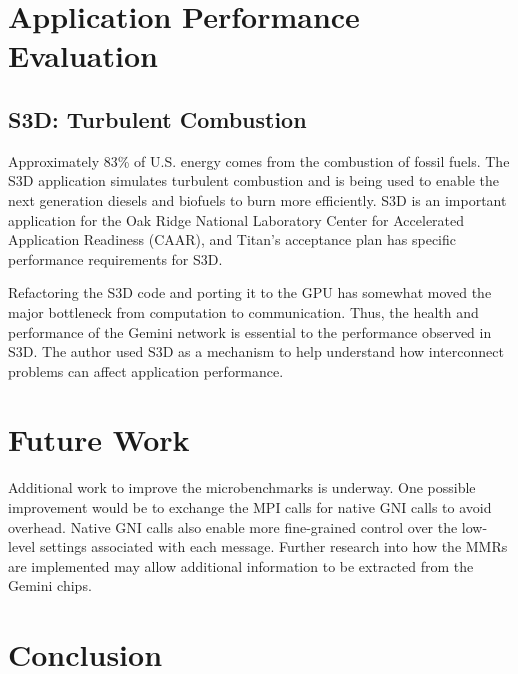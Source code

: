 \documentclass[10pt, conference, compsocconf]{IEEEtran}
\begin{document}



\section{Application Performance Evaluation}

\subsection{S3D: Turbulent Combustion}

Approximately 83\% of U.S. energy comes from the combustion of fossil fuels.
The S3D application simulates turbulent combustion and is being used to enable
the next generation diesels and biofuels to burn more efficiently.  S3D is an
important application for the Oak Ridge National Laboratory Center for
Accelerated Application Readiness (CAAR), and Titan's acceptance plan has
specific performance requirements for S3D. 

Refactoring the S3D code and porting it to the GPU has somewhat moved the major
bottleneck from computation to communication.  Thus, the health and performance
of the Gemini network is essential to the performance observed in S3D.  The
author used S3D as a mechanism to help understand how interconnect problems can
affect application performance.

\section{Future Work}

Additional work to improve the microbenchmarks is underway.  One possible
improvement would be to exchange the MPI calls for native GNI calls to avoid
overhead.  Native GNI calls also enable more fine-grained control over the
low-level settings associated with each message.  Further research into how the
MMRs are implemented may allow additional information to be extracted from the
Gemini chips.

\section{Conclusion}
\end{document}
